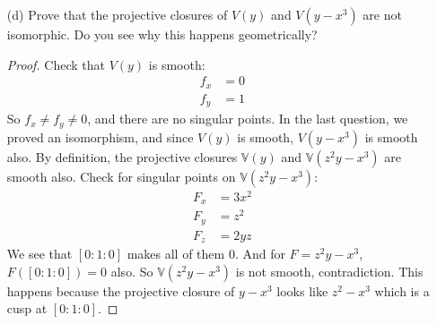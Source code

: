 \documentclass{article}
\begin{document}
\begin{itemize}
        \item [(d)] Prove that the projective closures of $V(y)$ and $V(y - x^{3})$ are not isomorphic. Do you see why this happens geometrically?
            \begin{proof}
                Check that $V(y)$ is smooth:
                    \begin{align*}
                        f_{x} &= 0 \\
                        f_{y} &= 1   
                    \end{align*}
                So $f_{x} \neq f_{y} \neq 0$, and there are no singular points. In the last question, we proved an isomorphism, and since $V(y)$ is smooth, $V(y - x^{3})$ is smooth also. By definition, the projective closures $\mathbb{V}(y)$ and $\mathbb{V}(z^{2}y - x^{3})$ are smooth also. Check for singular points on $\mathbb{V}(z^{2}y - x^{3})$:
                    \begin{align*}
                        F_{x} &= 3x^{2} \\
                        F_{y} &= z^{2}  \\
                        F_{z} &= 2yz      
                    \end{align*}
                We see that $[0 : 1 : 0]$ makes all of them $0$. And for $F = z^{2}y - x^{3}$, $F([0 : 1 : 0]) = 0$ also. So $\mathbb{V}(z^{2}y - x^{3})$ is not smooth, contradiction. This happens because the projective closure of $y - x^{3}$ looks like $z^{2} - x^{3}$ which is a cusp at $[0 : 1 : 0]$.
            \end{proof}
    \end{itemize}

\newpage
\end{document}
